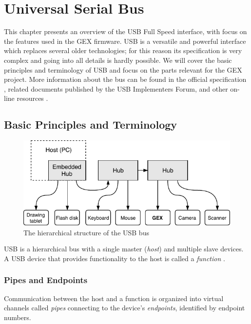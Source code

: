 \chapter{Universal Serial Bus}

This chapter presents an overview of the \acrfull{USB} Full Speed interface, with focus on the features used in the GEX firmware. \gls{USB} is a versatile and powerful interface which replaces several older technologies; for this reason its specification is very complex and going into all details is hardly possible. We will cover the basic principles and terminology of \gls{USB} and focus on the parts relevant for the GEX project. More information about the bus can be found in the official specification \cite{usbif-spec}, related documents published by the USB Implementers Forum, and other on-line resources \cite{usb-nutshell,usb-made-simple}.

\section{Basic Principles and Terminology}

\begin{figure}[h]
	\centering
	\includegraphics[scale=1] {img/usb-hierarchy-redraw.pdf}
	\caption[USB hierarchical structure]{\label{fig:usb-hierarchy}The hierarchical structure of the USB bus}
\end{figure}

\gls{USB} is a hierarchical bus with a single master (\textit{host}) and multiple slave devices. A \gls{USB} device that provides functionality to the host is called a \textit{function} \cite{usb-function}. 

\subsection{Pipes and Endpoints}

Communication between the host and a function is organized into virtual channels called \textit{pipes} connecting to the device's \textit{endpoints}, identified by endpoint numbers.

